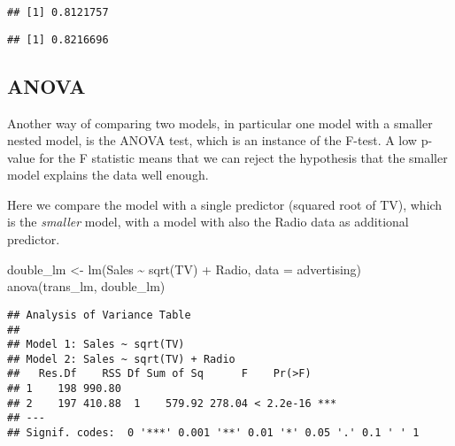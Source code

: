\documentclass[
  oneside]{book}
\newenvironment{Shaded}{\begin{snugshade}}{\end{snugshade}}
\newcommand{\AttributeTok}[1]{\textcolor[rgb]{0.77,0.63,0.00}{#1}}
\newcommand{\FunctionTok}[1]{\textcolor[rgb]{0.00,0.00,0.00}{#1}}
\newcommand{\NormalTok}[1]{#1}
\newcommand{\OtherTok}[1]{\textcolor[rgb]{0.56,0.35,0.01}{#1}}
\newcommand{\SpecialCharTok}[1]{\textcolor[rgb]{0.00,0.00,0.00}{#1}}
\begin{document}
\begin{Shaded}
\end{Shaded}

\begin{verbatim}
## [1] 0.8121757
\end{verbatim}

\begin{Shaded}
\end{Shaded}

\begin{verbatim}
## [1] 0.8216696
\end{verbatim}

\hypertarget{anova}{%
\subsection{ANOVA}\label{anova}}

Another way of comparing two models, in particular one model with
a smaller nested model, is the ANOVA test, which is an instance
of the F-test.
A low p-value for the F statistic means that we can reject the hypothesis that
the smaller model explains the data well enough.

Here we compare the model with a single predictor (squared root of TV), which
is the \emph{smaller} model, with a model with also the Radio data as
additional predictor.

\begin{Shaded}
\begin{Highlighting}[]
\NormalTok{double\_lm }\OtherTok{\textless{}{-}} \FunctionTok{lm}\NormalTok{(Sales }\SpecialCharTok{\textasciitilde{}} \FunctionTok{sqrt}\NormalTok{(TV) }\SpecialCharTok{+}\NormalTok{ Radio, }\AttributeTok{data =}\NormalTok{ advertising)}
\FunctionTok{anova}\NormalTok{(trans\_lm, double\_lm)}
\end{Highlighting}
\end{Shaded}

\begin{verbatim}
## Analysis of Variance Table
## 
## Model 1: Sales ~ sqrt(TV)
## Model 2: Sales ~ sqrt(TV) + Radio
##   Res.Df    RSS Df Sum of Sq      F    Pr(>F)    
## 1    198 990.80                                  
## 2    197 410.88  1    579.92 278.04 < 2.2e-16 ***
## ---
## Signif. codes:  0 '***' 0.001 '**' 0.01 '*' 0.05 '.' 0.1 ' ' 1
\end{verbatim}
\end{document}
